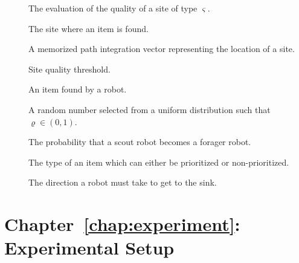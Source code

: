 \begin{description}
	\item[\parbox{\namewidth}{$\mu_\varsigma$}] The evaluation of the quality of a site of type $\varsigma$.

	
	\item[\parbox{\namewidth}{$\xi$}] The site where an item is found.

	\item[\parbox{\namewidth}{$\omega$}] A memorized path integration vector representing the location of a site.

	\item[\parbox{\namewidth}{$\Phi$}] Site quality threshold.

	
	\item[\parbox{\namewidth}{$\vartheta$}] An item found by a robot.

	\item[\parbox{\namewidth}{$\varrho$}] A random number selected from a uniform distribution such that $\varrho\in(0,1)$.
	
	\item[\parbox{\namewidth}{$\rho$}] The probability that a scout robot becomes a forager robot.
	

	\item[\parbox{\namewidth}{$\varsigma$}] The type of an item which can either be prioritized or non-prioritized.

\item[\parbox{\namewidth}{$\sigma$}] The direction a robot must take to get to the sink.

	

\end{description}

\section{Chapter~\ref{chap:experiment}: Experimental Setup}
\label{sec:symbols:foraging}


